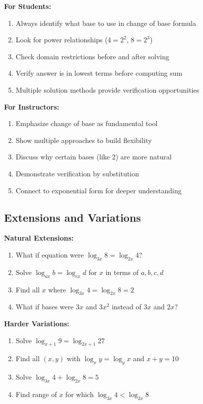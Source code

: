 \documentclass[12pt]{article}
\begin{document}
\begin{competitionbox}
\textbf{For Students:}
\begin{enumerate}
    \item Always identify what base to use in change of base formula
    \item Look for power relationships ($4 = 2^2$, $8 = 2^3$)
    \item Check domain restrictions before and after solving
    \item Verify answer is in lowest terms before computing sum
    \item Multiple solution methods provide verification opportunities
\end{enumerate}

\textbf{For Instructors:}
\begin{enumerate}
    \item Emphasize change of base as fundamental tool
    \item Show multiple approaches to build flexibility
    \item Discuss why certain bases (like 2) are more natural
    \item Demonstrate verification by substitution
    \item Connect to exponential form for deeper understanding
\end{enumerate}

\subsection*{Extensions and Variations}

\textbf{Natural Extensions:}
\begin{enumerate}
    \item What if equation were $\log_{3x} 8 = \log_{2x} 4$?
    \item Solve $\log_{ax} b = \log_{cx} d$ for $x$ in terms of $a,b,c,d$
    \item Find all $x$ where $\log_{3x} 4 = \log_{2x} 8 = 2$
    \item What if bases were $3x$ and $3x^2$ instead of $3x$ and $2x$?
\end{enumerate}

\textbf{Harder Variations:}
\begin{enumerate}
    \item Solve $\log_{x+1} 9 = \log_{2x+1} 27$
    \item Find all $(x,y)$ with $\log_x y = \log_y x$ and $x + y = 10$
    \item Solve $\log_{3x} 4 + \log_{2x} 8 = 5$
    \item Find range of $x$ for which $\log_{3x} 4 < \log_{2x} 8$
\end{enumerate}


\end{competitionbox}
\end{document}
